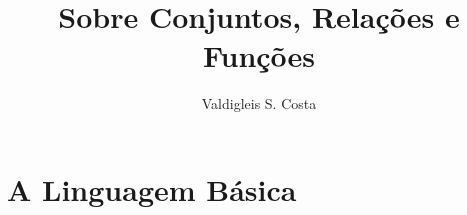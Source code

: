 \documentclass[b5paper,10pt]{book}
\title{Sobre Conjuntos, Relações e Funções}
\author{Valdigleis S. Costa} %
\begin{document}
	
	\frontmatter
	
		
	
	
	\tableofcontents
	
	\mainmatter
	
	\part{A Linguagem Básica}
		
	
	
        
        
	
	


	
	
		
\end{document}
